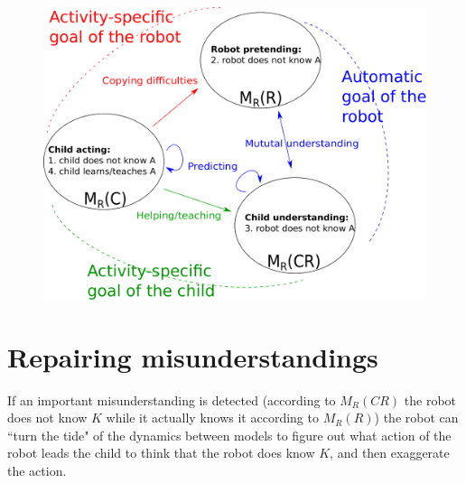 \documentclass[conference]{IEEEtran}
\begin{document}
\begin{figure}[!]
\centering
\includegraphics[width=1\columnwidth]{mutual_behaviour}
\caption{\small\textbf{}  }
\label{mm}
\end{figure} 

\section{Repairing misunderstandings}
If an important misunderstanding is detected (according to $M_R(\textit{CR})$ the robot does not know $K$ while it actually knows it according to $M_R(\textit{R})$) the robot can ``turn the tide" of the dynamics between models to figure out what action of the robot leads the child to think that the robot does know $K$, and then exaggerate the action.






\end{document}
